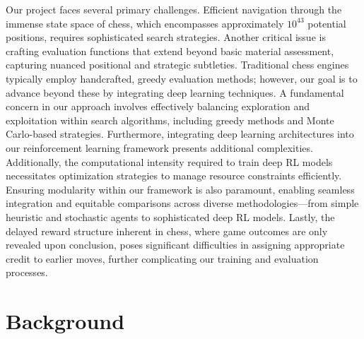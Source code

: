 \documentclass[journal, a4paper]{IEEEtran}
\begin{document}
Our project faces several primary challenges. Efficient navigation through the immense state space of chess, which encompasses approximately $10^{43}$ potential positions, requires sophisticated search strategies. Another critical issue is crafting evaluation functions that extend beyond basic material assessment, capturing nuanced positional and strategic subtleties. Traditional chess engines typically employ handcrafted, greedy evaluation methods; however, our goal is to advance beyond these by integrating deep learning techniques.
A fundamental concern in our approach involves effectively balancing exploration and exploitation within search algorithms, including greedy methods and Monte Carlo-based strategies. Furthermore, integrating deep learning architectures into our reinforcement learning framework presents additional complexities. 
Additionally, the computational intensity required to train deep RL models necessitates optimization strategies to manage resource constraints efficiently. Ensuring modularity within our framework is also paramount, enabling seamless integration and equitable comparisons across diverse methodologies—from simple heuristic and stochastic agents to sophisticated deep RL models.
Lastly, the delayed reward structure inherent in chess, where game outcomes are only revealed upon conclusion, poses significant difficulties in assigning appropriate credit to earlier moves, further complicating our training and evaluation processes.

\section{Background}
\label{sec:background}
\end{document}
